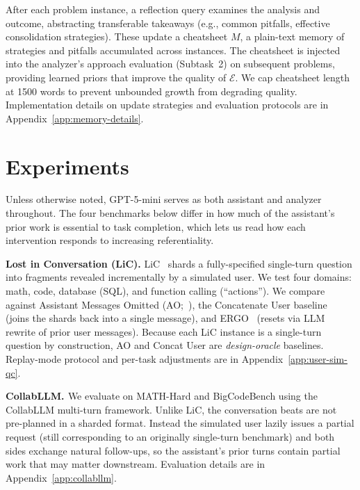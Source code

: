 \documentclass{article}
\begin{document}
After each problem instance, a reflection query examines the analysis and outcome, abstracting transferable takeaways (e.g., common pitfalls, effective consolidation strategies). These update a cheatsheet $M$, a plain-text memory of strategies and pitfalls accumulated across instances. The cheatsheet is injected into the analyzer's approach evaluation (Subtask~2) on subsequent problems, providing learned priors that improve the quality of $\mathcal{E}$. We cap cheatsheet length at 1500 words to prevent unbounded growth from degrading quality. Implementation details on update strategies and evaluation protocols are in Appendix~\ref{app:memory-details}.


\section{Experiments}
\label{sec:experiments}

Unless otherwise noted, GPT-5-mini serves as both assistant and analyzer throughout. The four benchmarks below differ in how much of the assistant's prior work is essential to task completion, which lets us read how each intervention responds to increasing referentiality.

\noindent\textbf{Lost in Conversation (LiC).}
LiC~\citep{laban2025lost} shards a fully-specified single-turn question into fragments revealed incrementally by a simulated user. We test four domains: math, code, database (SQL), and function calling (``actions''). We compare against Assistant Messages Omitted (AO;~\citealt{huang2026context}), the Concatenate User baseline~\citep{laban2025lost} (joins the shards back into a single message), and ERGO~\citep{khalid2025ergo} (resets via LLM rewrite of prior user messages). Because each LiC instance is a single-turn question by construction, AO and Concat User are \emph{design-oracle} baselines. Replay-mode protocol and per-task adjustments are in Appendix~\ref{app:user-sim-qc}.

\noindent\textbf{CollabLLM. \citep{wu2025collabllm}}
We evaluate on MATH-Hard and BigCodeBench using the CollabLLM multi-turn framework. Unlike LiC, the conversation beats are not pre-planned in a sharded format. Instead the simulated user lazily issues a partial request (still corresponding to an originally single-turn benchmark) and both sides exchange natural follow-ups, so the assistant's prior turns contain partial work that may matter downstream. Evaluation details are in Appendix~\ref{app:collabllm}.
\end{document}
